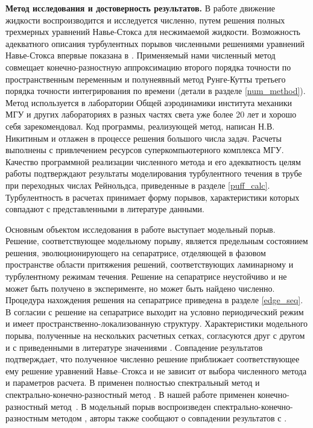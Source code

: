 {\bf Метод исследования и достоверность результатов.}
В работе движение жидкости воспроизводится и исследуется численно, путем решения полных трехмерных уравнений Навье-Стокса для несжимаемой жидкости. Возможность адекватного описания турбулентных порывов численными решениями уравнений Навье-Стокса впервые показана в \cite{Priymak2004}. Применяемый нами численный метод совмещает конечно-разностную аппроксимацию второго порядка точности по пространственным переменным и полунеявный метод Рунге-Кутты третьего порядка точности интегрирования по времени \cite{Nikitin2006, Nikitin2006third} (детали в разделе \ref{num_method}). Метод используется в лаборатории Общей аэродинамики института механики МГУ и других лабораториях в разных частях света уже более 20 лет и хорошо себя зарекомендовал. Код программы, реализующей метод, написан Н.В.\,Никитиным и отлажен в процессе решения большого числа задач. Расчеты выполнены с привлечением ресурсов суперкомпьютерного комплекса МГУ. Качество программной реализации численного метода и его адекватность целям работы подтверждают результаты моделирования турбулентного течения в трубе при переходных числах Рейнольдса, приведенные в разделе \ref{puff_calc}. Турбулентность в расчетах принимает форму порывов, характеристики которых совпадают с представленными в литературе данными. 

Основным объектом исследования в работе выступает модельный порыв. Решение, соответствующее модельному порыву, является предельным состоянием решения, эволюционирующего на сепаратрисе, отделяющей в фазовом пространстве области притяжения решений, соответствующих ламинарному и турбулентному режимам течения. Решение на сепаратрисе неустойчиво и не может быть получено в эксперименте, но может быть найдено численно. Процедура нахождения решения на сепаратрисе приведена в разделе \ref{edge_seq}. В согласии с \cite{Avila2013} решение на сепаратрисе выходит на условно периодический режим и имеет пространственно-локализованную структуру. Характеристики модельного порыва, полученные на нескольких расчетных сетках, согласуются друг с другом и с приведенными в литературе значениями \cite{Avila2013, Chantry2014}. Совпадение результатов подтверждает, что полученное численно решение приближает соответствующее ему решение уравнений Навье--Стокса и не зависит от выбора численного метода и параметров расчета. В \cite{Avila2013} применен полностью спектральный метод \cite{Meseguer2007} и спектрально-конечно-разностный метод \cite{Willis2009}. В нашей работе применен конечно-разностный метод~\cite{Nikitin2006}. В \cite{Chantry2014} модельный порыв воспроизведен спектрально-конечно-разностным методом \cite{Willis2009}, авторы также сообщают о совпадении результатов с \cite{Avila2013}. 


